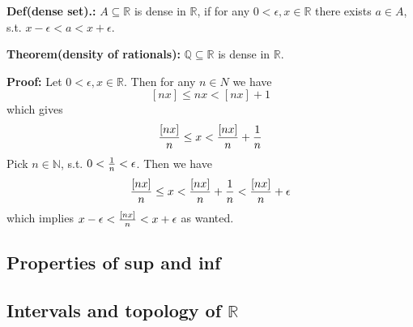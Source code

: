 \documentclass{article}
\begin{document}
\textbf{Def(dense set).:} $A\subseteq \mathbb{R}$ is dense in $\mathbb{R}$, if for any $0<\epsilon, x\in \mathbb{R}$ there exists $a\in A$, s.t. $x-\epsilon<a<x+\epsilon$.

\textbf{Theorem(density of rationals):} $\mathbb{Q\subseteq\mathbb{R}}$ is dense in $\mathbb{R}$.

\textbf{Proof:} Let $0<\epsilon, x\in \mathbb{R}$. Then for any $n\in N$ we have 
\[
[nx]\leq nx<[nx] + 1
\]
which gives
\[
{[nx]\over n}\leq x <{[nx]\over n} + {1\over n}
\]
Pick $n\in \mathbb{N}$, s.t. $0<{1\over n}<\epsilon$. Then we have
\[
{[nx]\over n}\leq x <{[nx]\over n} +{1\over n}<{[nx]\over n} +\epsilon
\]
which implies $x-\epsilon<{[nx]\over n} <x+\epsilon$ as wanted.

\subsection{Properties of sup and inf}



\subsection{Intervals and topology of $\mathbb{R}$}
\end{document}
